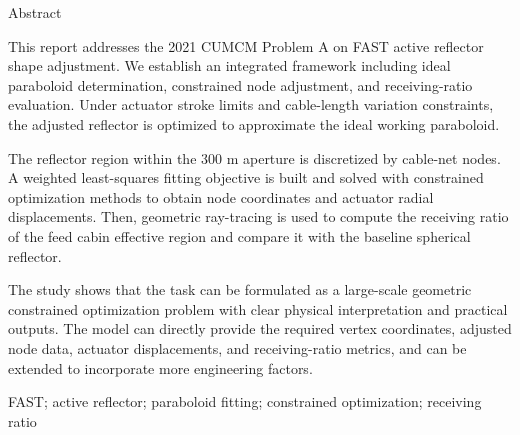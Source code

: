 \thispagestyle{plain}
{}
\centerline{\heiti Abstract}

\linespread{1.3}\bigskip

This report addresses the 2021 CUMCM Problem A on FAST active reflector shape adjustment. We establish an integrated framework including ideal paraboloid determination, constrained node adjustment, and receiving-ratio evaluation. Under actuator stroke limits and cable-length variation constraints, the adjusted reflector is optimized to approximate the ideal working paraboloid.

The reflector region within the 300 m aperture is discretized by cable-net nodes. A weighted least-squares fitting objective is built and solved with constrained optimization methods to obtain node coordinates and actuator radial displacements. Then, geometric ray-tracing is used to compute the receiving ratio of the feed cabin effective region and compare it with the baseline spherical reflector.

The study shows that the task can be formulated as a large-scale geometric constrained optimization problem with clear physical interpretation and practical outputs. The model can directly provide the required vertex coordinates, adjusted node data, actuator displacements, and receiving-ratio metrics, and can be extended to incorporate more engineering factors.

\bigskip
{}
FAST; active reflector; paraboloid fitting; constrained optimization; receiving ratio
